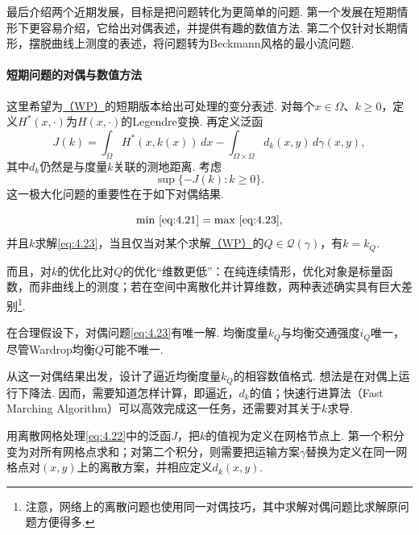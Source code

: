 最后介绍两个近期发展，目标是把问题转化为更简单的问题. 第一个发展在短期情形下更容易介绍，它给出对偶表述，并提供有趣的数值方法. 第二个仅针对长期情形，摆脱曲线上测度的表述，将问题转为Beckmann风格的最小流问题.

\paragraph*{短期问题的对偶与数值方法}
这里希望为\hyperref[eq:4.21]{（WP）}的短期版本给出可处理的变分表述. 对每个$x\in\Omega$、$k\geq0$，定义$H^*(x,\cdot)$为$H(x,\cdot)$的Legendre变换. 再定义泛函
\begin{equation}\label{eq:4.22}
J(k)=\int_\Omega H^*(x,k(x))\,dx
-\int_{\Omega\times\Omega}d_k(x,y)\,d\gamma(x,y),
\end{equation}
其中$d_k$仍然是与度量$k$关联的测地距离. 考虑
\begin{equation}\label{eq:4.23}
\sup\{-J(k):k\geq0\}.
\end{equation}
这一极大化问题的重要性在于如下对偶结果.

\begin{proposition}\label{obj:4.34}
\begin{equation}\label{eq:4.24}
\min\,\eqref{eq:4.21}=\max\,\eqref{eq:4.23},
\end{equation}
并且$k$求解\eqref{eq:4.23}，当且仅当对某个求解\hyperref[eq:4.21]{（WP）}的$Q\in\mathscr Q(\gamma)$，有$k=k_Q$.
\end{proposition}

而且，对$k$的优化比对$Q$的优化“维数更低”：在纯连续情形，优化对象是标量函数，而非曲线上的测度；若在空间中离散化并计算维数，两种表述确实具有巨大差别\footnote{注意，网络上的离散问题也使用同一对偶技巧，其中求解对偶问题比求解原问题方便得多.}.

\begin{remark}\label{obj:4.35}
在合理假设下，对偶问题\eqref{eq:4.23}有唯一解. 均衡度量$k_Q$与均衡交通强度$i_Q$唯一，尽管Wardrop均衡$Q$可能不唯一.
\end{remark}
从这一对偶结果出发，\cite{b42,b43}设计了逼近均衡度量$k_Q$的相容数值格式. 想法是在对偶上运行下降法. 因而，需要知道怎样计算，即逼近，$d_k$的值；快速行进算法（Fast Marching Algorithm）可以高效完成这一任务，还需要对其关于$k$求导.

用离散网格处理\eqref{eq:4.22}中的泛函$J$，把$k$的值视为定义在网格节点上. 第一个积分变为对所有网格点求和；对第二个积分，则需要把运输方案$\gamma$替换为定义在同一网格点对$(x,y)$上的离散方案，并相应定义$d_k(x,y)$.

